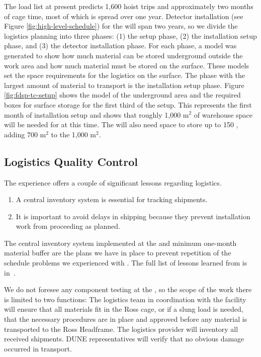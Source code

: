 The load list at present predicts 1,600 hoist trips and approximately two  months of cage time, most of which is spread over one year. 
Detector installation (see Figure \ref{fig:high-level-schedule}) for the  will span two years, so we divide the logistics planning into three phases: (1) the  setup phase, (2) the installation setup phase, and (3) the detector installation phase. 
For each phase, a \threed model was generated to show how much material can be stored underground outside the work area and how much material must be stored on the surface. 
These models set the space requirements for the logistics on the surface. 
The phase with the largest amount of material to transport is the installation setup phase.  
Figure \ref{fig:fdsp-tc-setup} shows the model of the underground area and the required boxes for surface storage for the first third of the setup. 
This represents the first month of installation setup and shows that roughly 1,000 m$^2$ of warehouse space will be needed for  at this time.  The  will also need space to store up to 150 , 
adding 700 m$^2$ to the 1,000 m$^2$. 


\subsection{Logistics Quality Control}
\label{sec:fdsp-tc-log-qaqc}


 
The  experience offers a couple of significant lessons regarding logistics.

\begin{enumerate}
\item A central inventory system is essential for tracking  shipments.
\item It is important to avoid delays in shipping because they prevent installation work from  proceeding as planned. 
\end{enumerate}

The central inventory system  implemented at the   and minimum one-month material buffer are the plans we have in place to prevent repetition of the schedule problems we experienced with .   The full list of lessons learned from  is in~\cite{bib:docdb8255}. 

We do not foresee any component testing at the , so the scope of the  work there is limited to two functions: 
The  logistics team in coordination with the facility will ensure that all materials fit in the Ross cage, or if a slung load is needed, that the necessary procedures are in place and approved before any material is transported to the Ross Headframe.  
The logistics provider will inventory all received shipments. DUNE representatives will verify that no obvious damage occurred in transport.

